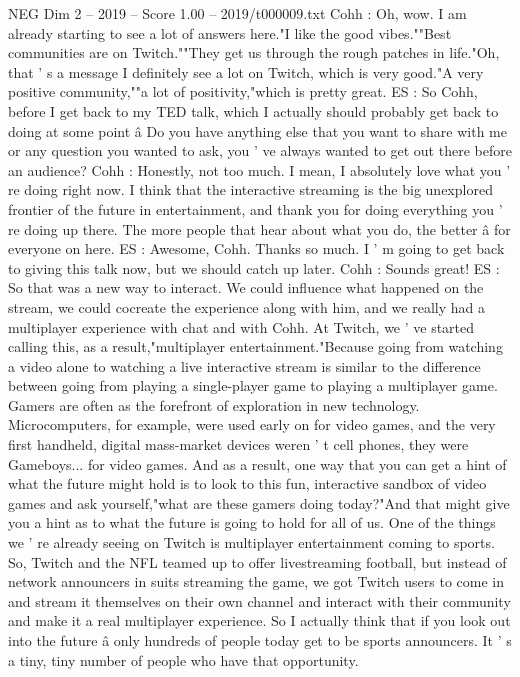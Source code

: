 \begin{textsample}{NEG Dim 2 – 2019 – Score 1.00 – 2019/t000009.txt}
Cohh : Oh, wow.
I am already starting to see a lot of answers here."I like the good vibes.""Best communities are on Twitch.""They get us through the rough patches in life."Oh, that ' s a message I definitely see a lot on Twitch, which is very good."A very positive community,""a lot of positivity,"which is pretty great.
ES : So Cohh, before I get back to my TED talk, which I actually should probably get back to doing at some point â Do you have anything else that you want to share with me or any question you wanted to ask, you ' ve always wanted to get out there before an audience?
Cohh : Honestly, not too much.
I mean, I absolutely love what you ' re doing right now.
I think that the interactive streaming is the big unexplored frontier of the future in entertainment, and thank you for doing everything you ' re doing up there.
The more people that hear about what you do, the better â for everyone on here.
ES : Awesome, Cohh.
Thanks so much.
I ' m going to get back to giving this talk now, but we should catch up later.
Cohh : Sounds great!
ES : So that was a new way to interact.
We could influence what happened on the stream, we could cocreate the experience along with him, and we really had a multiplayer experience with chat and with Cohh.
At Twitch, we ' ve started calling this, as a result,"multiplayer entertainment."Because going from watching a video alone to watching a live interactive stream is similar to the difference between going from playing a single-player game to playing a multiplayer game.
Gamers are often as the forefront of exploration in new technology.
Microcomputers, for example, were used early on for video games, and the very first handheld, digital mass-market devices weren ' t cell phones, they were Gameboys... for video games.
And as a result, one way that you can get a hint of what the future might hold is to look to this fun, interactive sandbox of video games and ask yourself,"what are these gamers doing today?"And that might give you a hint as to what the future is going to hold for all of us.
One of the things we ' re already seeing on Twitch is multiplayer entertainment coming to sports.
So, Twitch and the NFL teamed up to offer livestreaming football, but instead of network announcers in suits streaming the game, we got Twitch users to come in and stream it themselves on their own channel and interact with their community and make it a real multiplayer experience.
So I actually think that if you look out into the future â only hundreds of people today get to be sports announcers.
It ' s a tiny, tiny number of people who have that opportunity.

\end{textsample}
